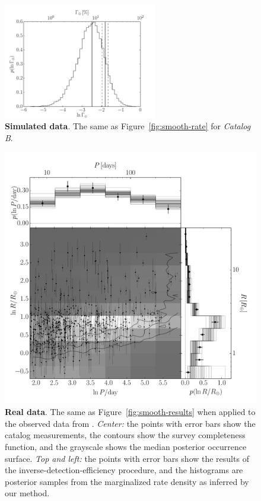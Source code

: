 \documentclass[12pt,preprint]{aastex}
\newcommand{\figref}[1]{\ref{fig:#1}}
\newcommand{\Fig}[1]{Figure~\figref{#1}}
\newcommand{\fig}[1]{\Fig{#1}}
\newcommand{\figlabel}[1]{\label{fig:#1}}
\newcommand{\modelb}{\emph{Catalog B}}
\begin{document}
\begin{figure}[p]
\begin{center}
\includegraphics[width=0.6\textwidth]{figures/simulation/rate.pdf}
\end{center}
\caption{%
{\bf Simulated data}.
The same as \fig{smooth-rate} for \modelb.
\figlabel{simulation-rate}}
\end{figure}

\begin{figure}[p]
\begin{center}
\includegraphics[width=\textwidth]{figures/results/results.pdf}
\end{center}
\caption{%
{\bf Real data}.
The same as \fig{smooth-results} when applied to the observed data from
\citet{petigura}.
\emph{Center:} the points with error bars show the catalog measurements, the
contours show the survey completeness function, and the grayscale shows the
median posterior occurrence surface.
\emph{Top and left:} the points with error bars show the results of the
inverse-detection-efficiency procedure, and the histograms are posterior
samples from the marginalized rate density as inferred by our method.
\figlabel{real-results}}
\end{figure}
\end{document}
